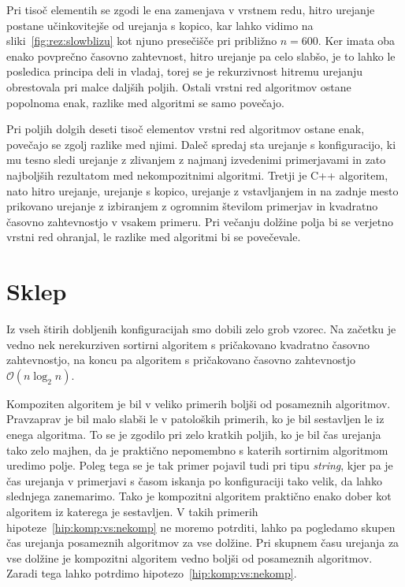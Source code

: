 \documentclass[a4paper,oneside,12pt]{article}
\begin{document}
Pri tisoč elementih se zgodi le ena zamenjava v vrstnem redu, hitro urejanje
postane učinkovitejše od urejanja s kopico, kar lahko vidimo na
sliki~\ref{fig:rez:slowblizu} kot njuno presečišče pri približno $n = 600$.
Ker imata oba enako povprečno časovno zahtevnost, hitro urejanje pa celo slabšo, je to lahko le posledica
principa deli in vladaj, torej se je rekurzivnost hitremu urejanju obrestovala
pri malce daljših poljih. Ostali vrstni red algoritmov ostane popolnoma enak,
razlike med algoritmi se samo povečajo.

Pri poljih dolgih deseti tisoč elementov vrstni red algoritmov ostane enak,
povečajo se zgolj razlike med njimi. Daleč spredaj sta urejanje s konfiguracijo,
ki mu tesno sledi urejanje z zlivanjem z najmanj izvedenimi primerjavami in zato najboljših
rezultatom med nekompozitnimi algoritmi. Tretji je C++ algoritem, nato hitro urejanje,
urejanje s kopico, urejanje z vstavljanjem in na zadnje mesto prikovano urejanje z izbiranjem z
ogromnim številom primerjav in kvadratno časovno zahtevnostjo v vsakem primeru.
Pri večanju dolžine polja bi se verjetno vrstni red ohranjal, le razlike med
algoritmi bi se povečevale.


\section{Sklep}
Iz vseh štirih dobljenih konfiguracijah smo dobili zelo grob vzorec. Na začetku
je vedno nek nerekurziven sortirni algoritem s pričakovano kvadratno časovno zahtevnostjo,
na koncu pa algoritem s pričakovano časovno zahtevnostjo
$\mathcal{O}(n\log_2n)$.

Kompoziten algoritem je bil v veliko primerih boljši od posameznih
algoritmov. Pravzaprav je bil malo slabši le v patoloških primerih, ko je bil
sestavljen le iz enega algoritma. To se je zgodilo pri zelo kratkih poljih, ko
je bil čas urejanja tako zelo majhen, da je praktično nepomembno s katerih
sortirnim algoritmom uredimo polje. Poleg tega se je tak primer pojavil tudi pri
tipu \emph{string}, kjer pa je čas urejanja v primerjavi s časom iskanja po
konfiguraciji tako velik, da lahko slednjega zanemarimo. Tako je kompozitni
algoritem praktično enako dober kot algoritem iz katerega je sestavljen.
V takih primerih hipoteze~\ref{hip:komp:vs:nekomp} ne moremo potrditi, 
lahko pa pogledamo skupen čas urejanja posameznih algoritmov za vse dolžine.
Pri skupnem času urejanja za vse dolžine je kompozitni algoritem vedno boljši od
posameznih algoritmov. Zaradi tega lahko potrdimo hipotezo~\ref{hip:komp:vs:nekomp}.
\end{document}
